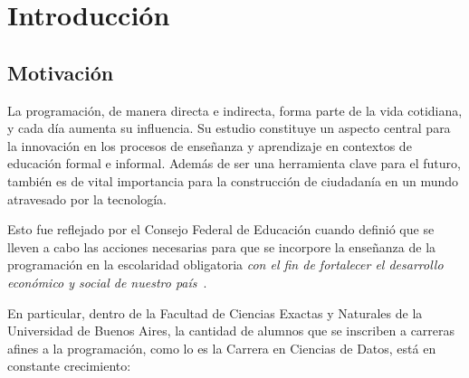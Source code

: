 \documentclass[11pt,a4paper,twoside,openany]{tesis}
\begin{document}

\def\autor{Carla de Erausquin}
\def\tituloTesis{Caracterización de trayectorias educativas a partir de producciones de código}
\def\runtitulo{Caracterización de trayectorias educativas a partir de producciones de código}
\def\runtitle{Characterization of educational trajectories based on Code Productions}
\def\director{Matías López y Rosenfeld}
\def\codirector{Pablo Turjanski}
\def\lugar{Buenos Aires, 2024}


\frontmatter
\pagestyle{empty}


\cleardoublepage

\cleardoublepage

\cleardoublepage

\cleardoublepage
\tableofcontents

\mainmatter
\pagestyle{headings}


\chapter{Introducción}
\section{Motivación}

La programación, de manera directa e indirecta, forma parte de la vida cotidiana, y cada día aumenta su influencia. Su estudio constituye un aspecto central para la innovación en los procesos de enseñanza y aprendizaje en contextos de educación formal e informal. Además de ser una herramienta clave para el futuro, también es de vital importancia para la construcción de ciudadanía en un mundo atravesado por la tecnología. 

Esto fue reflejado por el Consejo Federal de Educación cuando definió que se lleven a cabo las acciones necesarias para que se incorpore la enseñanza de la programación en la escolaridad obligatoria \emph{con el fin de fortalecer el desarrollo económico y social de nuestro país}~\cite{resolucionProgramar}.

En particular, dentro de la Facultad de Ciencias Exactas y Naturales de la Universidad de Buenos Aires, la cantidad de alumnos que se inscriben a carreras afines a la programación, como lo es la Carrera en Ciencias de Datos, está en constante crecimiento: 
\end{document}
